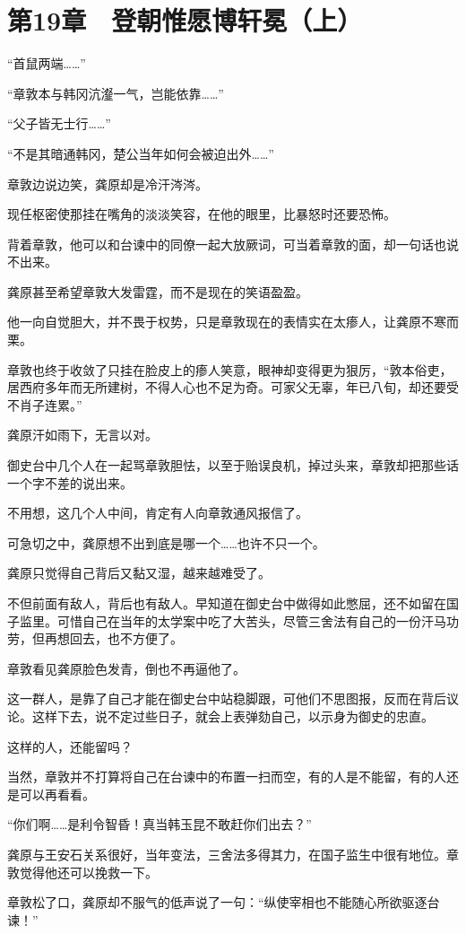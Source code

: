 \section{第19章　登朝惟愿博轩冕（上）}

“首鼠两端……”

“章敦本与韩冈沆瀣一气，岂能依靠……”

“父子皆无士行……”

“不是其暗通韩冈，楚公当年如何会被迫出外……”

章敦边说边笑，龚原却是冷汗涔涔。

现任枢密使那挂在嘴角的淡淡笑容，在他的眼里，比暴怒时还要恐怖。

背着章敦，他可以和台谏中的同僚一起大放厥词，可当着章敦的面，却一句话也说不出来。

龚原甚至希望章敦大发雷霆，而不是现在的笑语盈盈。

他一向自觉胆大，并不畏于权势，只是章敦现在的表情实在太瘆人，让龚原不寒而栗。

章敦也终于收敛了只挂在脸皮上的瘆人笑意，眼神却变得更为狠厉，“敦本俗吏，居西府多年而无所建树，不得人心也不足为奇。可家父无辜，年已八旬，却还要受不肖子连累。”

龚原汗如雨下，无言以对。

御史台中几个人在一起骂章敦胆怯，以至于贻误良机，掉过头来，章敦却把那些话一个字不差的说出来。

不用想，这几个人中间，肯定有人向章敦通风报信了。

可急切之中，龚原想不出到底是哪一个……也许不只一个。

龚原只觉得自己背后又黏又湿，越来越难受了。

不但前面有敌人，背后也有敌人。早知道在御史台中做得如此憋屈，还不如留在国子监里。可惜自己在当年的太学案中吃了大苦头，尽管三舍法有自己的一份汗马功劳，但再想回去，也不方便了。

章敦看见龚原脸色发青，倒也不再逼他了。

这一群人，是靠了自己才能在御史台中站稳脚跟，可他们不思图报，反而在背后议论。这样下去，说不定过些日子，就会上表弹劾自己，以示身为御史的忠直。

这样的人，还能留吗？

当然，章敦并不打算将自己在台谏中的布置一扫而空，有的人是不能留，有的人还是可以再看看。

“你们啊……是利令智昏！真当韩玉昆不敢赶你们出去？”

龚原与王安石关系很好，当年变法，三舍法多得其力，在国子监生中很有地位。章敦觉得他还可以挽救一下。

章敦松了口，龚原却不服气的低声说了一句：“纵使宰相也不能随心所欲驱逐台谏！”

